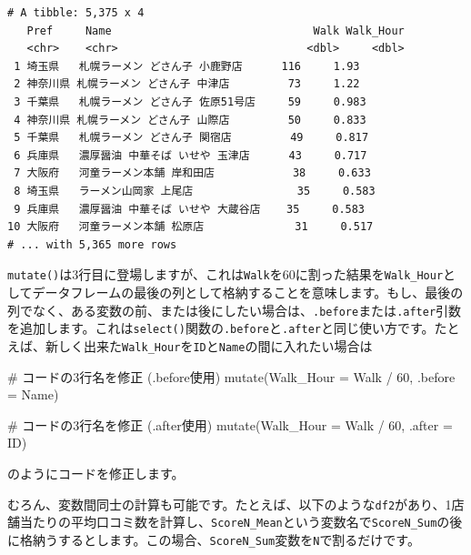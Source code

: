 \documentclass[
  a4paper,
  pandoc,
  ja=standard,
  jafont=haranoaji]{bxjsbook}
\newenvironment{Shaded}{\begin{snugshade}}{\end{snugshade}}
\newcommand{\AttributeTok}[1]{\textcolor[rgb]{0.00,0.48,0.65}{#1}}
\newcommand{\CommentTok}[1]{\textcolor[rgb]{0.37,0.37,0.37}{#1}}
\newcommand{\DecValTok}[1]{\textcolor[rgb]{0.68,0.00,0.00}{#1}}
\newcommand{\FunctionTok}[1]{\textcolor[rgb]{0.28,0.35,0.67}{#1}}
\newcommand{\NormalTok}[1]{\textcolor[rgb]{0.00,0.48,0.65}{#1}}
\newcommand{\SpecialCharTok}[1]{\textcolor[rgb]{0.37,0.37,0.37}{#1}}
\begin{document}
\begin{verbatim}
# A tibble: 5,375 x 4
   Pref     Name                               Walk Walk_Hour
   <chr>    <chr>                             <dbl>     <dbl>
 1 埼玉県   札幌ラーメン どさん子 小鹿野店      116     1.93 
 2 神奈川県 札幌ラーメン どさん子 中津店         73     1.22 
 3 千葉県   札幌ラーメン どさん子 佐原51号店     59     0.983
 4 神奈川県 札幌ラーメン どさん子 山際店         50     0.833
 5 千葉県   札幌ラーメン どさん子 関宿店         49     0.817
 6 兵庫県   濃厚醤油 中華そば いせや 玉津店      43     0.717
 7 大阪府   河童ラーメン本舗 岸和田店            38     0.633
 8 埼玉県   ラーメン山岡家 上尾店                35     0.583
 9 兵庫県   濃厚醤油 中華そば いせや 大蔵谷店    35     0.583
10 大阪府   河童ラーメン本舗 松原店              31     0.517
# ... with 5,365 more rows
\end{verbatim}

\texttt{mutate()}は3行目に登場しますが、これは\texttt{Walk}を60に割った結果を\texttt{Walk\_Hour}としてデータフレームの最後の列として格納することを意味します。もし、最後の列でなく、ある変数の前、または後にしたい場合は、\texttt{.before}または\texttt{.after}引数を追加します。これは\texttt{select()}関数の\texttt{.before}と\texttt{.after}と同じ使い方です。たとえば、新しく出来た\texttt{Walk\_Hour}を\texttt{ID}と\texttt{Name}の間に入れたい場合は

\begin{Shaded}
\begin{Highlighting}[numbers=left,,]
\CommentTok{\# コードの3行名を修正 (.before使用)}
\FunctionTok{mutate}\NormalTok{(}\AttributeTok{Walk\_Hour =}\NormalTok{ Walk }\SpecialCharTok{/} \DecValTok{60}\NormalTok{,}
       \AttributeTok{.before   =}\NormalTok{ Name)}

\CommentTok{\# コードの3行名を修正 (.after使用)}
\FunctionTok{mutate}\NormalTok{(}\AttributeTok{Walk\_Hour =}\NormalTok{ Walk }\SpecialCharTok{/} \DecValTok{60}\NormalTok{,}
       \AttributeTok{.after    =}\NormalTok{ ID)}
\end{Highlighting}
\end{Shaded}

のようにコードを修正します。

むろん、変数間同士の計算も可能です。たとえば、以下のような\texttt{df2}があり、1店舗当たりの平均口コミ数を計算し、\texttt{ScoreN\_Mean}という変数名で\texttt{ScoreN\_Sum}の後に格納うするとします。この場合、\texttt{ScoreN\_Sum}変数を\texttt{N}で割るだけです。
\end{document}
